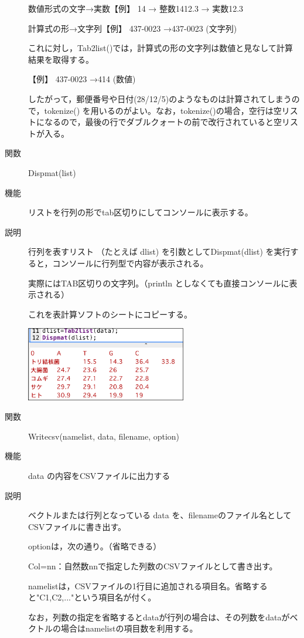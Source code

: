 \documentclass[papersize,a4paper,12pt,uplatex]{jsarticle}
\begin{document}
\begin{description}
数値形式の文字→実数【例】 14 → 整数1412.3 → 実数12.3

計算式の形→文字列【例】 437-0023 →437-0023 (文字列)

これに対し，Tab2list()では，計算式の形の文字列は数値と見なして計算結果を取得する。

\vspace{\baselineskip}
【例】 437-0023 →414 (数値)

したがって，郵便番号や日付(28/12/5)のようなものは計算されてしまうので，tokenize() を用いるのがよい。なお，tokenize()の場合，空行は空リストになるので，最後の行でダブルクォートの前で改行されていると空リストが入る。


\vspace{\baselineskip}
\hypertarget{dispmat}{}
\item[関数]Dispmat(list)
\item[機能]リストを行列の形でtab区切りにしてコンソールに表示する。
\item[説明]行列を表すリスト （たとえば dlist) を引数としてDispmat(dlist) を実行すると，コンソールに行列型で内容が表示される。

実際にはTAB区切りの文字列。（println としなくても直接コンソールに表示される）

これを表計算ソフトのシートにコピーする。

\vspace{\baselineskip}
\hspace{10mm} \includegraphics[bb=0 0 427.52 197.51 , width=7cm]{Fig/tab2list04.pdf}


\vspace{\baselineskip}
\hypertarget{writecsv}{}
\item[関数]Writecsv(namelist, data, filename, option)
\item[機能]data の内容をCSVファイルに出力する
\item[説明]ベクトルまたは行列となっている data を、filenameのファイル名としてCSVファイルに書き出す。

optionは，次の通り。（省略できる）

Col=nn：自然数nnで指定した列数のCSVファイルとして書き出す。
 
namelistは，CSVファイルの1行目に追加される項目名。省略すると"C1,C2,..."という項目名が付く。

 
なお，列数の指定を省略するとdataが行列の場合は、その列数をdataがベクトルの場合はnamelistの項目数を利用する。

\end{description}
\end{document}
